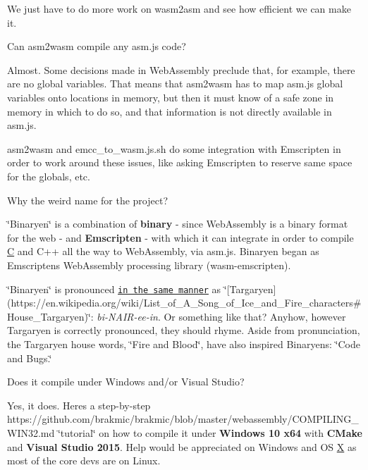 We just have to do more work on {\ttfamily wasm2asm} and see how efficient we can make it.


\begin{DoxyItemize}
\item Can {\ttfamily asm2wasm} compile any asm.\+js code?
\end{DoxyItemize}

Almost. Some decisions made in Web\+Assembly preclude that, for example, there are no global variables. That means that {\ttfamily asm2wasm} has to map asm.\+js global variables onto locations in memory, but then it must know of a safe zone in memory in which to do so, and that information is not directly available in asm.\+js.

{\ttfamily asm2wasm} and {\ttfamily emcc\+\_\+to\+\_\+wasm.\+js.\+sh} do some integration with Emscripten in order to work around these issues, like asking Emscripten to reserve same space for the globals, etc.


\begin{DoxyItemize}
\item Why the weird name for the project?
\end{DoxyItemize}

\char`\"{}\+Binaryen\char`\"{} is a combination of {\bfseries binary} -\/ since Web\+Assembly is a binary format for the web -\/ and {\bfseries Emscripten} -\/ with which it can integrate in order to compile \mbox{\hyperlink{struct_c}{C}} and C++ all the way to Web\+Assembly, via asm.\+js. Binaryen began as Emscripten\textquotesingle{}s Web\+Assembly processing library ({\ttfamily wasm-\/emscripten}).

\char`\"{}\+Binaryen\char`\"{} is pronounced \href{http://www.makinggameofthrones.com/production-diary/2011/2/11/official-pronunciation-guide-for-game-of-thrones.html}{\tt in the same manner} as \char`\"{}\mbox{[}\+Targaryen\mbox{]}(https\+://en.\+wikipedia.\+org/wiki/\+List\+\_\+of\+\_\+\+A\+\_\+\+Song\+\_\+of\+\_\+\+Ice\+\_\+and\+\_\+\+Fire\+\_\+characters\#\+House\+\_\+\+Targaryen)\char`\"{}\+: {\itshape bi-\/\+N\+A\+I\+R-\/ee-\/in}. Or something like that? Anyhow, however Targaryen is correctly pronounced, they should rhyme. Aside from pronunciation, the Targaryen house words, \char`\"{}\+Fire and Blood\char`\"{}, have also inspired Binaryen\textquotesingle{}s\+: \char`\"{}\+Code and Bugs.\char`\"{}


\begin{DoxyItemize}
\item Does it compile under Windows and/or Visual Studio?
\end{DoxyItemize}

Yes, it does. Here\textquotesingle{}s a step-\/by-\/step https\+://github.com/brakmic/brakmic/blob/master/webassembly/\+C\+O\+M\+P\+I\+L\+I\+N\+G\+\_\+\+W\+I\+N32.\+md \char`\"{}tutorial\char`\"{} on how to compile it under {\bfseries Windows 10 x64} with {\bfseries C\+Make} and {\bfseries Visual Studio 2015}. Help would be appreciated on Windows and OS \mbox{\hyperlink{class_x}{X}} as most of the core devs are on Linux. 